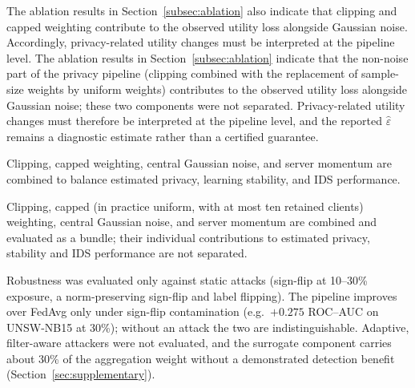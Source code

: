 The ablation results in Section~\ref{subsec:ablation} also indicate that clipping and capped weighting contribute to the observed utility loss alongside Gaussian noise. Accordingly, privacy-related utility changes must be interpreted at the pipeline level.
The ablation results in Section~\ref{subsec:ablation} indicate that the non-noise part of the privacy pipeline (clipping combined with the replacement of sample-size weights by uniform weights) contributes to the observed utility loss alongside Gaussian noise; these two components were not separated. Privacy-related utility changes must therefore be interpreted at the pipeline level, and the reported $\widehat{\varepsilon}$ remains a diagnostic estimate rather than a certified guarantee.

\item Clipping, capped weighting, central Gaussian noise, and server momentum are combined to balance estimated privacy, learning stability, and IDS performance.
\item Clipping, capped (in practice uniform, with at most ten retained clients) weighting, central Gaussian noise, and server momentum are combined and evaluated as a bundle; their individual contributions to estimated privacy, stability and IDS performance are not separated.


Robustness was evaluated only against static attacks (sign-flip at 10--30\% exposure, a norm-preserving sign-flip and label flipping). The pipeline improves over FedAvg only under sign-flip contamination (e.g.\ $+0.275$ ROC--AUC on UNSW-NB15 at 30\%); without an attack the two are indistinguishable. Adaptive, filter-aware attackers were not evaluated, and the surrogate component carries about 30\% of the aggregation weight without a demonstrated detection benefit (Section~\ref{sec:supplementary}).

